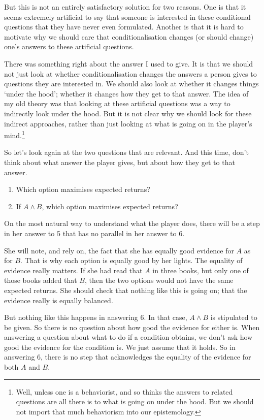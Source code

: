 \documentclass[11pt,]{book}
\providecommand{\tightlist}{%
  \setlength{\itemsep}{0pt}\setlength{\parskip}{0pt}}
\let\rmarkdownfootnote\footnote%
\def\footnote{\protect\rmarkdownfootnote}
\begin{document}
But this is not an entirely satisfactory solution for two reasons. One is that it seems extremely artificial to say that someone is interested in these conditional questions that they have never even formulated. Another is that it is hard to motivate why we should care that conditionalisation changes (or should change) one's answers to these artificial questions.

There was something right about the answer I used to give. It is that we should not just look at whether conditionalisation changes the answers a person gives to questions they are interested in. We should also look at whether it changes things `under the hood'; whether it changes how they get to that answer. The idea of my old theory was that looking at these artificial questions was a way to indirectly look under the hood. But it is not clear why we should look for these indirect approaches, rather than just looking at what is going on in the player's mind.\footnote{Well, unless one is a behaviorist, and so thinks the answers to related questions are all there is to what is going on under the hood. But we should not import that much behaviorism into our epistemology.}

So let's look again at the two questions that are relevant. And this time, don't think about what answer the player gives, but about how they get to that answer.

\begin{enumerate}
\def\labelenumi{\arabic{enumi}.}
\setcounter{enumi}{4}
\tightlist
\item
  Which option maximises expected returns?
\item
  If \(A \wedge B\), which option maximises expected returns?
\end{enumerate}

On the most natural way to understand what the player does, there will be a step in her answer to 5 that has no parallel in her answer to 6.

She will note, and rely on, the fact that she has equally good evidence for \(A\) as for \(B\). That is why each option is equally good by her lights. The equality of evidence really matters. If she had read that \(A\) in three books, but only one of those books added that \(B\), then the two options would not have the same expected returns. She should check that nothing like this is going on; that the evidence really is equally balanced.

But nothing like this happens in answering 6. In that case, \(A \wedge B\) is stipulated to be given. So there is no question about how good the evidence for either is. When answering a question about what to do if a condition obtains, we don't ask how good the evidence for the condition is. We just assume that it holds. So in answering 6, there is no step that acknowledges the equality of the evidence for both \(A\) and \(B\).
\end{document}

